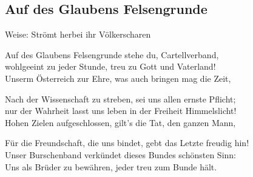 
\subsection*{Auf des Glaubens Felsengrunde}
%
%

\hfill%
Weise: Strömt herbei ihr Völkerscharen%
\smallskip%

\thestrophe Auf des Glaubens Felsengrunde stehe du, Cartellverband, \\
wohlgeeint zu jeder Stunde, treu zu Gott und Vaterland! \\
Unserm Österreich zur Ehre, was auch bringen mag die Zeit, \\

\thestrophe Nach der Wissenschaft zu streben, sei uns allen ernste Pflicht; \\
nur der Wahrheit lasst uns leben in der Freiheit Himmelslicht! \\
Hohen Zielen aufgeschlossen, gilt's die Tat, den ganzen Mann, \\

\thestrophe Für die Freundschaft, die uns bindet, gebt das Letzte freudig hin! \\
Unser Burschenband verkündet dieses Bundes schönsten Sinn: \\
Uns als Brüder zu bewähren, jeder treu zum Bunde hält.\\
